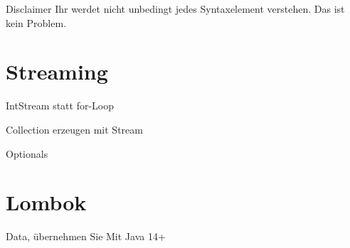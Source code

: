 \documentclass{beamer}
\begin{document}
\begin{frame}{Disclaimer}
  Ihr werdet nicht unbedingt jedes Syntaxelement verstehen. Das ist kein Problem.
\end{frame}

\section{Streaming}
\begin{frame}{IntStream statt for-Loop}
    \stream
\end{frame}
\begin{frame}{Collection erzeugen mit Stream}
    \streamCollect
\end{frame}
\begin{frame}{Optionals}
    \optional
\end{frame}

\section{Lombok}
\begin{frame}{Data, übernehmen Sie}
  \data\pause
  \vfill
  Mit Java 14+
  \record
\end{frame}
\end{document}

